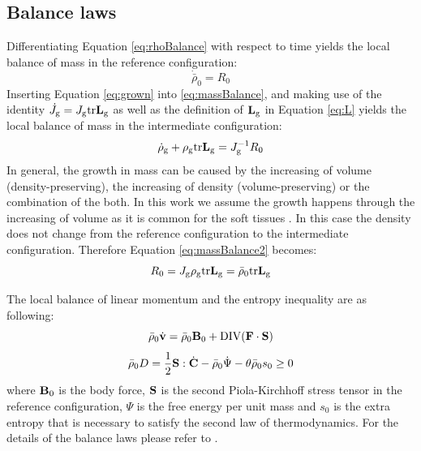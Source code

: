 \subsection{Balance laws}
Differentiating Equation \ref{eq:rhoBalance} with respect to time yields the local balance of mass in the reference configuration:
\begin{equation} \label{eq:massBalance}
\dot{\bar{\rho}}_0 = R_0
\end{equation}
Inserting Equation \ref{eq:grown} into \ref{eq:massBalance}, and making use of the identity $\dot{J}_{\mathrm{g}} = J_{\mathrm{g}} \mathrm{tr} \bold{L}_{\mathrm{g}}$ as well as the definition of $\bold{L}_{\mathrm{g}}$ in Equation \ref{eq:L} yields the local balance of mass in the intermediate configuration:
\begin{equation} \label{eq:massBalance2}
\dot{\rho}_\mathrm{g} + \rho_{\mathrm{g}} \mathrm{tr}\bold{L}_{\mathrm{g}} = J_{\mathrm{g}}^{-1}R_0
\end{equation}
In general, the growth in mass can be caused by the increasing of volume (density-preserving), the increasing of density (volume-preserving) or the combination of the both. In this work we assume the growth happens through the increasing of volume as it is common for the soft tissues \cite{Menzel}. In this case the density does not change from the reference configuration to the intermediate configuration. Therefore Equation \ref{eq:massBalance2} becomes:
\begin{equation} \label{eq:massBalance3}
R_0 = J_{\mathrm{g}}\rho_{\mathrm{g}} \mathrm{tr}\bold{L}_{\mathrm{g}} = \bar{\rho}_0\mathrm{tr}\bold{L}_{\mathrm{g}}
\end{equation}

The local balance of linear momentum and the entropy inequality are as following:
\begin{equation} \label{eq:momentumBalance}
\bar{\rho}_0\dot{\bold{v}} = \bar{\rho}_0\bold{B}_0 + \mathrm{DIV}(\bold{F} \cdot \bold{S})
\end{equation}
\begin{equation} \label{eq:entropy}
\bar{\rho}_0 D= \frac{1}{2}\bold{S} : \dot{\bold{C}} - \bar{\rho}_0 \dot \Psi  - \theta\bar{\rho}_0 s_0 \geq 0
\end{equation}
where $\bold{B}_0$ is the body force, $\bold{S}$ is the second Piola-Kirchhoff stress tensor in the reference configuration, $\Psi$ is the free energy per unit mass and $s_0$ is the extra entropy that is necessary to satisfy the second law of thermodynamics. For the details of the balance laws please refer to \cite{Kuhl2, Lubarda2}.





